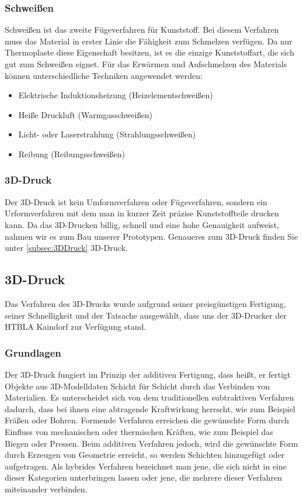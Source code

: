 \subsubsection{Schweißen}
Schweißen ist das zweite Fügeverfahren für Kunststoff.
Bei diesem Verfahren muss das Material in erster Linie die Fähigkeit zum Schmelzen verfügen.
Da nur Thermoplaste diese Eigenschaft besitzen, ist es die einzige Kunststoffart, die sich gut zum Schweißen eignet.
Für das Erwärmen und Aufschmelzen des Materials können unterschiedliche Techniken angewendet werden:
\begin{itemize}
    \item Elektrische Induktionsheizung (Heizelementschweißen)
    \item Heiße Druckluft (Warmgasschweißen)
    \item Licht- oder Laserstrahlung (Strahlungsschweißen)
    \item Reibung (Reibungsschweißen)
\end{itemize}

\subsubsection{3D-Druck}
Der 3D-Druck ist kein Umformverfahren oder Fügeverfahren, sondern ein Urformverfahren mit dem man in kurzer Zeit präzise Kunststoffteile
drucken kann.
Da das 3D-Drucken billig, schnell und eine hohe Genauigkeit aufweist, nahmen wir es zum Bau unserer Prototypen.
Genaueres zum 3D-Druck finden Sie unter \autoref{subsec:3DDruck} 3D-Druck.

\subsection{3D-Druck} \label{subsec:3DDruck}
 Das Verfahren des 3D-Drucks wurde aufgrund seiner preisgünstigen Fertigung, seiner Schnelligkeit und der Tatsache
ausgewählt, dass uns der 3D-Drucker der HTBLA Kaindorf zur Verfügung stand.
\subsubsection{Grundlagen}
Der 3D-Druck fungiert im Prinzip der additiven Fertigung, dass heißt, er fertigt Objekte aus 3D-Modelldaten Schicht für Schicht
durch das Verbinden von Materialien.
Es unterscheidet sich von dem traditionellen subtraktiven Verfahren dadurch, dass bei ihnen eine abtragende Kraftwirkung herrscht, wie zum Beispiel Fräßen oder Bohren.
Formende Verfahren erreichen die gewünschte Form durch Einfluss von mechanischen oder thermischen Kräften, wie zum Beispiel das Biegen oder Pressen.
Beim additiven Verfahren jedoch, wird die gewünschte Form durch Erzeugen von Geometrie erreicht, so werden Schichten hinzugefügt oder aufgetragen.
Als hybrides Verfahren bezeichnet man jene, die sich nicht in eine dieser Kategorien unterbringen lassen oder jene, die mehrere dieser Verfahren miteinander verbinden.


